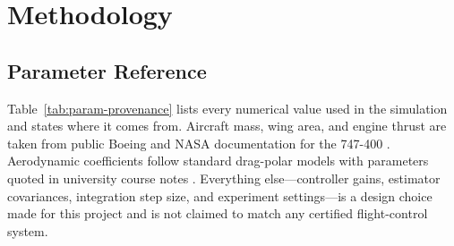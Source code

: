 \documentclass{Academic}
\begin{document}
\section{Methodology}

\subsection{Parameter Reference}

Table~\ref{tab:param-provenance} lists every numerical value used in the simulation and states where it comes from. Aircraft mass, wing area, and engine thrust are taken from public Boeing and NASA documentation for the 747-400 \supercite{boeing747400,burken1997,pw400094guide}. Aerodynamic coefficients follow standard drag-polar models with parameters quoted in university course notes \supercite{mahajan2014,raymer2018}. Everything else---controller gains, estimator covariances, integration step size, and experiment settings---is a design choice made for this project and is not claimed to match any certified flight-control system.
\end{document}
